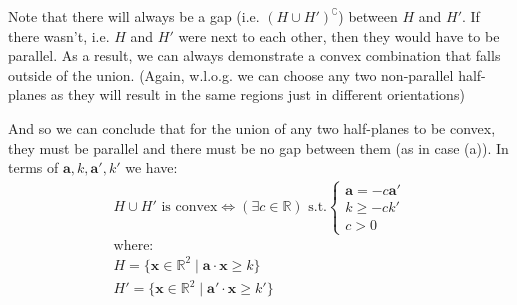 \documentclass{article}
\renewcommand\vec{\mathbf}
\newcommand{\R}{\mathbb R}
\begin{document}
Note that there will always be a gap (i.e. $(H\cup H')^\complement$) between $H$ and $H'$. If there wasn't, i.e. $H$ and $H'$ were next to each other, then they would have to be parallel. As a result, we can always demonstrate a convex combination that falls outside of the union. (Again, w.l.o.g. we can choose any two non-parallel half-planes as they will result in the same regions just in different orientations)

And so we can conclude that for the union of any two half-planes to be convex, they must be parallel and there must be no gap between them (as in case (a)). In terms of $\vec a, k, \vec a', k'$ we have:
\begin{gather*}
    H\cup H'\text{ is convex}\iff
    (\exists c\in\R)\text{ s.t.}\begin{cases}
        \vec a=-c\vec a'\\
        k\ge-ck'\\
        c>0
    \end{cases}\\
\text{where:}\\
H=\{\vec x\in\R^2\mid \vec a\cdot\vec x\ge k\}\\
H'=\{\vec x\in\R^2\mid \vec a'\cdot\vec x\ge k'\}
\end{gather*}
\end{document}
